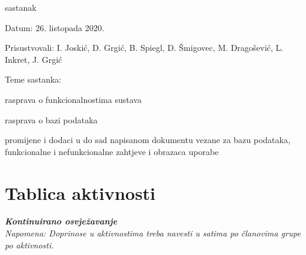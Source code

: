 \begin{packed_enum}
	\item  sastanak
	\item[] \begin{packed_item}
		\item Datum: 26. listopada 2020.
		\item Prisustvovali: I. Joskić, D. Grgić, B. Spiegl, D. Šmigovec, M. Dragošević, L. Inkret, J. Grgić
		\item Teme sastanka:
		\begin{packed_item}
			\item  rasprava o funkcionalnostima sustava
			\item  rasprava o bazi podataka
			\item  promijene i dodaci u do sad napisanom dokumentu vezane za bazu podataka, funkcionalne i nefunkcionalne zahtjeve i obrazaca uporabe
		\end{packed_item}
	\end{packed_item}
	
	
\end{packed_enum}

\eject
\section*{Tablica aktivnosti}

\textbf{\textit{Kontinuirano osvježavanje}}\\

\textit{Napomena: Doprinose u aktivnostima treba navesti u satima po članovima grupe po aktivnosti.}



